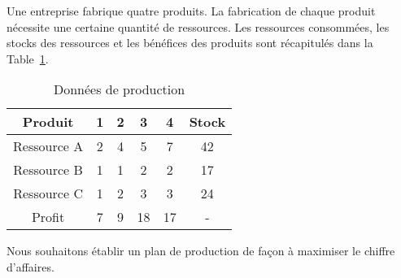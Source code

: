 \begin{example}[Production]
Une entreprise fabrique quatre produits.
La fabrication de chaque produit nécessite une certaine quantité de ressources.
Les ressources consommées, les stocks des ressources et les bénéfices des
produits sont récapitulés dans la Table~\ref{tab:prod_simplexe}.
\begin{table}[htbp]
\begin{center}
\begin{tabular}{|c|cccc|c|}
\hline
Produit & 1 & 2 & 3 & 4 & Stock \\
\hline
Ressource A & 2 & 4 & 5 & 7 & 42 \\
Ressource B & 1 & 1 & 2 & 2 & 17 \\
Ressource C & 1 & 2 & 3 & 3 & 24 \\
\hline
Profit & 7 & 9 & 18 & 17 & - \\
\hline
\end{tabular}
\end{center}
\caption{Données de production}
\label{tab:prod_simplexe}
\end{table}
Nous souhaitons établir un plan de production de façon à maximiser le chiffre d'affaires.


\end{example}
